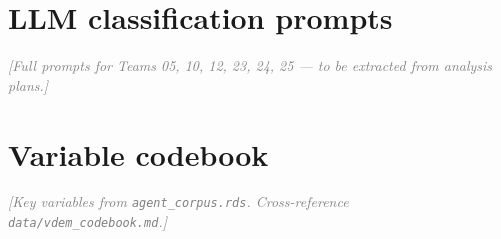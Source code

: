 \documentclass[12pt,a4paper]{article}
\newcommand{\placeholder}[1]{\textcolor{gray}{\textit{[#1]}}}
\begin{document}


\section{LLM classification prompts}
\label{app:prompts}

\placeholder{Full prompts for Teams 05, 10, 12, 23, 24, 25 --- to be
extracted from analysis plans.}

\section{Variable codebook}
\label{app:codebook}

\placeholder{Key variables from \texttt{agent\_corpus.rds}. Cross-reference
\texttt{data/vdem\_codebook.md}.}
\end{document}

